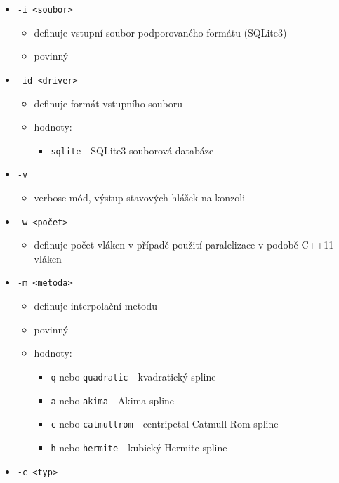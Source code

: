 \documentclass[]{thesiskiv}
\begin{document}
\begin{itemize}[noitemsep]
	\item \texttt{-i <soubor>}
		\begin{itemize}[noitemsep]
			\item definuje vstupní soubor podporovaného formátu (SQLite3)
			\item povinný
		\end{itemize}
	\item \texttt{-id <driver>}
		\begin{itemize}[noitemsep]
			\item definuje formát vstupního souboru
			\item hodnoty:
				\begin{itemize}[noitemsep]
					\item \texttt{sqlite} - SQLite3 souborová databáze
				\end{itemize} 
		\end{itemize}
	\item \texttt{-v}
		\begin{itemize}[noitemsep]
			\item verbose mód, výstup stavových hlášek na konzoli
		\end{itemize}
	\item \texttt{-w <počet>}
		\begin{itemize}[noitemsep]
			\item definuje počet vláken v případě použití paralelizace v podobě C++11 vláken
		\end{itemize}
	\item \texttt{-m <metoda>}
		\begin{itemize}[noitemsep]
			\item definuje interpolační metodu
			\item povinný
			\item hodnoty:
				\begin{itemize}[noitemsep]
					\item \texttt{q} nebo \texttt{quadratic} - kvadratický spline
					\item \texttt{a} nebo \texttt{akima} - Akima spline
					\item \texttt{c} nebo \texttt{catmullrom} - centripetal Catmull-Rom spline
					\item \texttt{h} nebo \texttt{hermite} - kubický Hermite spline
				\end{itemize} 
		\end{itemize}
	\item \texttt{-c <typ>}
		\begin{itemize}[noitemsep]

\end{itemize}
\end{itemize}
\end{document}
